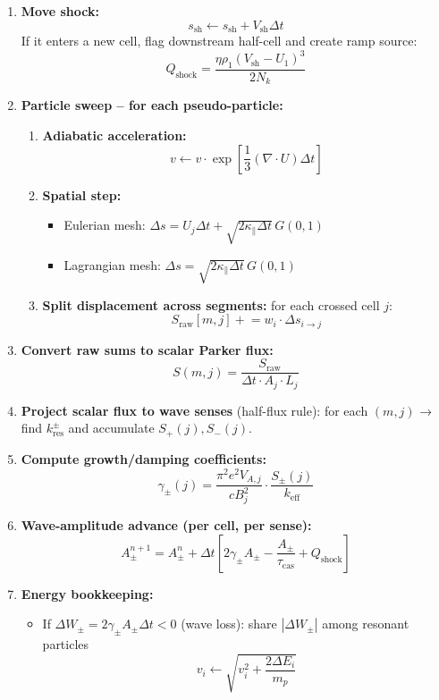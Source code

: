 \begin{enumerate}[label=\arabic*.]
\item \textbf{Move shock:}
\[
s_{\text{sh}} \leftarrow s_{\text{sh}} + V_{\text{sh}} \Delta t
\]
If it enters a new cell, flag downstream half-cell and create ramp source:
\[
Q_{\text{shock}} = \frac{\eta \rho_1 (V_{\text{sh}} - U_1)^3}{2N_k}
\]

\item \textbf{Particle sweep – for each pseudo-particle:}
\begin{enumerate}[label=\alph*.]
\item \textbf{Adiabatic acceleration:}
\[
v \leftarrow v \cdot \exp\left[\frac{1}{3}(\nabla \cdot U) \Delta t\right]
\]

\item \textbf{Spatial step:}
\begin{itemize}
\item Eulerian mesh: $\Delta s = U_j \Delta t + \sqrt{2\kappa_\parallel \Delta t}\, G(0,1)$
\item Lagrangian mesh: $\Delta s = \sqrt{2\kappa_\parallel \Delta t}\, G(0,1)$
\end{itemize}

\item \textbf{Split displacement across segments:} for each crossed cell $j$:
\[
S_{\text{raw}}[m,j] \mathrel{+}= w_i \cdot \Delta s_{i \to j}
\]
\end{enumerate}

\item \textbf{Convert raw sums to scalar Parker flux:}
\[
S(m,j) = \frac{S_{\text{raw}}}{\Delta t \cdot A_j \cdot L_j}
\]

\item \textbf{Project scalar flux to wave senses} (half-flux rule): 
for each $(m,j)$ → find $k_{\text{res}}^\pm$ and accumulate $S_+(j), S_-(j)$.

\item \textbf{Compute growth/damping coefficients:}
\[
\gamma_\pm(j) = \frac{\pi^2 e^2 V_{A,j}}{c B_j^2} \cdot \frac{S_\pm(j)}{k_{\text{eff}}}
\]

\item \textbf{Wave-amplitude advance (per cell, per sense):}
\[
A_\pm^{n+1} = A_\pm^n + \Delta t \left[ 2\gamma_\pm A_\pm - \frac{A_\pm}{\tau_{\text{cas}}} + Q_{\text{shock}} \right]
\]

\item \textbf{Energy bookkeeping:}
\begin{itemize}
\item If $\Delta W_\pm = 2\gamma_\pm A_\pm \Delta t < 0$ (wave loss): share $|\Delta W_\pm|$ among resonant particles
\[
v_i \leftarrow \sqrt{v_i^2 + \frac{2\Delta E_i}{m_p}}
\]


\end{itemize}
\end{enumerate}
